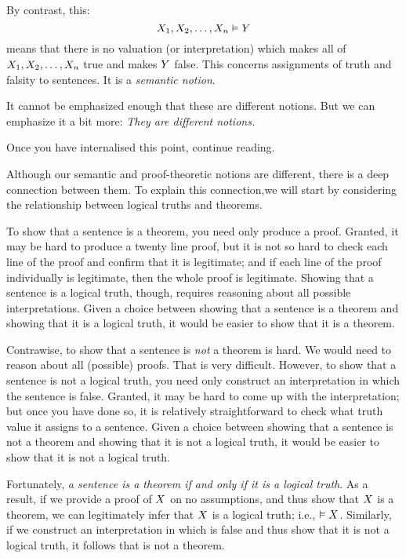 By contrast, this:
$$X_1, X_2, \ldots, X_n \vDash Y$$
means that there is no valuation (or interpretation) which makes all of $X_1, X_2, \ldots, X_n$ true and makes $Y$ false. This concerns assignments of truth and falsity to sentences. It is a \emph{semantic notion}.

It cannot be emphasized enough that these are different notions. But we can emphasize it a bit more: \emph{They are different notions.}

Once you have internalised this point, continue reading.

Although our semantic and proof-theoretic notions are different, there is a deep connection between them. To explain this connection,we will start by considering the relationship between logical truths and theorems.

To show that a sentence is a theorem, you need only produce a proof. Granted, it may be hard to produce a twenty line proof, but it is not so hard to check each line of the proof and confirm that it is legitimate; and if each line of the proof individually is legitimate, then the whole proof is legitimate. Showing that a sentence is a logical truth, though, requires reasoning about all possible interpretations. Given a choice between showing that a sentence is a theorem and showing that it is a logical truth, it would be easier to show that it is a theorem.

Contrawise, to show that a sentence is \emph{not} a theorem is hard. We would need to reason about all (possible) proofs. That is very difficult. However, to show that a sentence is not a logical truth, you need only construct an interpretation in which the sentence is false. Granted, it may be hard to come up with the interpretation; but once you have done so, it is relatively straightforward to check what truth value it assigns to a sentence. Given a choice between showing that a sentence is not a theorem and showing that it is not a logical truth, it would be easier to show that it is not a logical truth.

Fortunately, \emph{a sentence is a theorem if and only if it is a logical truth}. As a result, if we provide a proof of $X$ on no assumptions, and thus show that $X$ is a theorem, we can legitimately infer that $X$ is a logical truth; i.e., $\vDash X$. Similarly, if we construct an interpretation in which \metaX is false and thus show that it is not a logical truth, it follows that \metaX is not a theorem.

